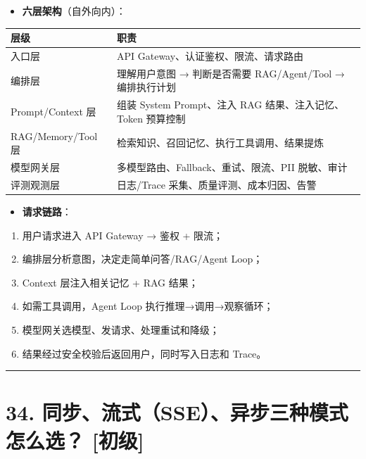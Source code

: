 \documentclass[9pt,a4paper,twocolumn]{ctexart}
\newcommand{\lvchu}{\usebox{\badgechubox}}
\def\lvchu{[初级]}%
\begin{document}
\begin{itemize}[itemsep=1pt, topsep=2pt]
  \item \textbf{六层架构}（自外向内）：
\end{itemize}

{\footnotesize
\begin{tabular}{|p{}|p{}|}
\hline
\textbf{层级} & \textbf{职责} \\
\hline
入口层 & API Gateway、认证鉴权、限流、请求路由 \\
\hline
编排层 & 理解用户意图 → 判断是否需要 RAG/Agent/Tool → 编排执行计划 \\
\hline
Prompt/Context 层 & 组装 System Prompt、注入 RAG 结果、注入记忆、Token 预算控制 \\
\hline
RAG/Memory/Tool 层 & 检索知识、召回记忆、执行工具调用、结果提炼 \\
\hline
模型网关层 & 多模型路由、Fallback、重试、限流、PII 脱敏、审计 \\
\hline
评测观测层 & 日志/Trace 采集、质量评测、成本归因、告警 \\
\hline
\end{tabular}
}


\begin{itemize}[itemsep=1pt, topsep=2pt]
  \item \textbf{请求链路}：
\end{itemize}
\begin{enumerate}[itemsep=1pt, topsep=2pt]
  \item 用户请求进入 API Gateway → 鉴权 + 限流；
  \item 编排层分析意图，决定走简单问答/RAG/Agent Loop；
  \item Context 层注入相关记忆 + RAG 结果；
  \item 如需工具调用，Agent Loop 执行推理→调用→观察循环；
  \item 模型网关选模型、发请求、处理重试和降级；
  \item 结果经过安全校验后返回用户，同时写入日志和 Trace。
\end{enumerate}


\vspace{2pt}
\noindent\rule{\columnwidth}{0.3pt}\vspace{2pt}



\section*{34. 同步、流式（SSE）、异步三种模式怎么选？ \lvchu{}}
\end{document}
